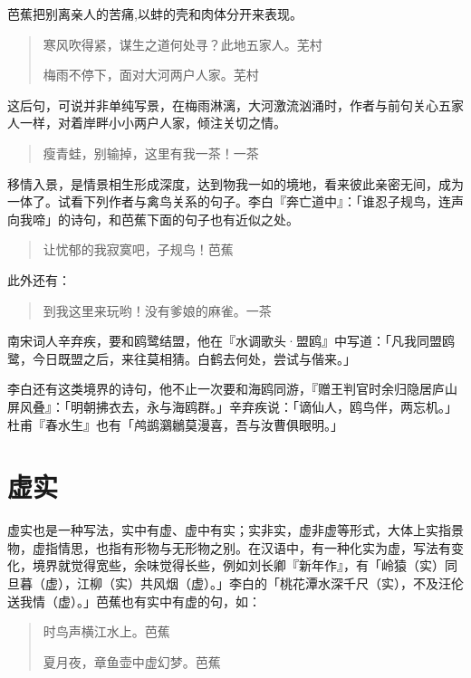 {    芭蕉把别离亲人的苦痛,以蚌的壳和肉体分开来表现。

    \begin{quote}
        寒风吹得紧，谋生之道何处寻？此地五家人。\hfill 芜村

        梅雨不停下，面对大河两户人家。\hfill 芜村
    \end{quote}

    这后句，可说并非单纯写景，在梅雨淋漓，大河激流汹涌时，作者与前句关心五家人一样，对着岸畔小小两户人家，倾注关切之情。

    \begin{quote}
        瘦青蛙，别输掉，这里有我一茶！\hfill 一茶
    \end{quote}

    移情入景，是情景相生形成深度，达到物我一如的境地，看来彼此亲密无间，成为一体了。试看下列作者与禽鸟关系的句子。李白『奔亡道中』：「谁忍子规鸟，连声向我啼」的诗句，和芭蕉下面的句子也有近似之处。

    \begin{quote}
        让忧郁的我寂寞吧，子规鸟！\hfill 芭蕉
    \end{quote}

    此外还有：
    \begin{quote}
        到我这里来玩哟！没有爹娘的麻雀。\hfill 一茶
    \end{quote}

    南宋词人辛弃疾，要和鸥鹭结盟，他在『水调歌头·盟鸥』中写道：「凡我同盟鸥鹭，今日既盟之后，来往莫相猜。白鹤去何处，尝试与偕来。」

    李白还有这类境界的诗句，他不止一次要和海鸥同游，『赠王判官时余归隐居庐山屏风叠』：「明朝拂衣去，永与海鸥群。」辛弃疾说：「谪仙人，鸥鸟伴，两忘机。」杜甫『春水生』也有「鸬鹚鸂鶒莫漫喜，吾与汝曹俱眼明。」

    \section*{\FS 虚实}

    虚实也是一种写法，实中有虚、虚中有实；实非实，虚非虚等形式，大体上实指景物，虚指情思，也指有形物与无形物之别。在汉语中，有一种化实为虚，写法有变化，境界就觉得宽些，余味觉得长些，例如刘长卿『新年作』，有「岭猿（实）同旦暮（虚），江柳（实）共风烟（虚）。」李白的「桃花潭水深千尺（实），不及汪伦送我情（虚）。」芭蕉也有实中有虚的句，如：

    \begin{quote}
        时鸟声横江水上。\hfill 芭蕉

        夏月夜，章鱼壶中虚幻梦。\hfill 芭蕉


\end{quote}}
